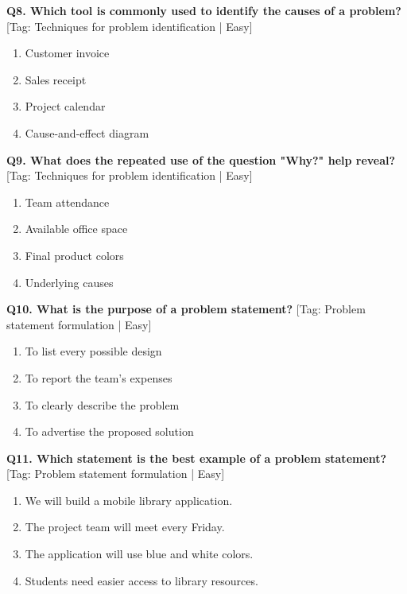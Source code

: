 \noindent\textbf{Q8. Which tool is commonly used to identify the causes of a problem?} \hfill [Tag: Techniques for problem identification | Easy]
\begin{enumerate}[label=(\alph*),topsep=2pt,itemsep=1pt,partopsep=0pt,parsep=0pt]
    \item {Customer invoice}
    \item {Sales receipt}
    \item {Project calendar}
    \item {Cause-and-effect diagram}
\end{enumerate}
\vspace{2mm}

\noindent\textbf{Q9. What does the repeated use of the question "Why?" help reveal?} \hfill [Tag: Techniques for problem identification | Easy]
\begin{enumerate}[label=(\alph*),topsep=2pt,itemsep=1pt,partopsep=0pt,parsep=0pt]
    \item {Team attendance}
    \item {Available office space}
    \item {Final product colors}
    \item {Underlying causes}
\end{enumerate}
\vspace{2mm}

\noindent\textbf{Q10. What is the purpose of a problem statement?} \hfill [Tag: Problem statement formulation | Easy]
\begin{enumerate}[label=(\alph*),topsep=2pt,itemsep=1pt,partopsep=0pt,parsep=0pt]
    \item {To list every possible design}
    \item {To report the team's expenses}
    \item {To clearly describe the problem}
    \item {To advertise the proposed solution}
\end{enumerate}
\vspace{2mm}

\noindent\textbf{Q11. Which statement is the best example of a problem statement?} \hfill [Tag: Problem statement formulation | Easy]
\begin{enumerate}[label=(\alph*),topsep=2pt,itemsep=1pt,partopsep=0pt,parsep=0pt]
    \item {We will build a mobile library application.}
    \item {The project team will meet every Friday.}
    \item {The application will use blue and white colors.}
    \item {Students need easier access to library resources.}
\end{enumerate}
\vspace{2mm}


